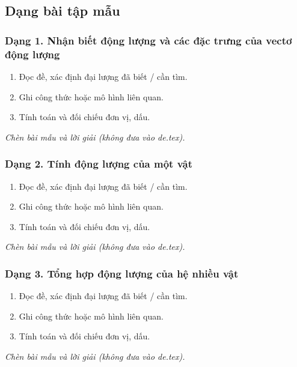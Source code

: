 

\subsection{Dạng bài tập mẫu}
\subsubsection{Dạng 1. Nhận biết động lượng và các đặc trưng của vectơ động lượng}
\begin{phuongphap}
\begin{enumerate}
\item Đọc đề, xác định đại lượng đã biết / cần tìm.
\item Ghi công thức hoặc mô hình liên quan.
\item Tính toán và đối chiếu đơn vị, dấu.
\end{enumerate}
\end{phuongphap}
\begin{vidumau}
\textit{Chèn bài mẫu và lời giải (không đưa vào de.tex).}
\end{vidumau}

\subsubsection{Dạng 2. Tính động lượng của một vật}
\begin{phuongphap}
\begin{enumerate}
\item Đọc đề, xác định đại lượng đã biết / cần tìm.
\item Ghi công thức hoặc mô hình liên quan.
\item Tính toán và đối chiếu đơn vị, dấu.
\end{enumerate}
\end{phuongphap}
\begin{vidumau}
\textit{Chèn bài mẫu và lời giải (không đưa vào de.tex).}
\end{vidumau}

\subsubsection{Dạng 3. Tổng hợp động lượng của hệ nhiều vật}
\begin{phuongphap}
\begin{enumerate}
\item Đọc đề, xác định đại lượng đã biết / cần tìm.
\item Ghi công thức hoặc mô hình liên quan.
\item Tính toán và đối chiếu đơn vị, dấu.
\end{enumerate}
\end{phuongphap}
\begin{vidumau}
\textit{Chèn bài mẫu và lời giải (không đưa vào de.tex).}
\end{vidumau}

